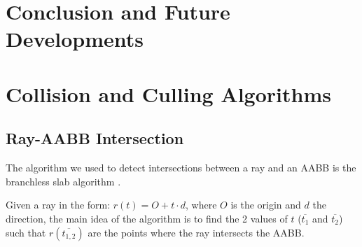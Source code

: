 \documentclass{PoliMi_MasterThesis}
\begin{document}
\chapter{Conclusion and Future Developments} \label{ch:conclusion}




\cleardoublepage
{} %
\appendix

\chapter{Collision and Culling Algorithms}
\section{Ray-AABB Intersection} \label{sec:ray_box_intersection}
The algorithm we used to detect intersections between a ray and an AABB is the branchless slab algorithm \cite{ray_box_intersection}.

Given a ray in the form: $r(t) = O + t\cdot d$, where $O$ is the origin and $d$ the direction, the main idea of the algorithm is to find the 2 values of $t$ ($\overline{t_1}$ and $\overline{t_2}$) such that $r(\overline{t_{1,2}})$ are the points where the ray intersects the AABB.
\end{document}
